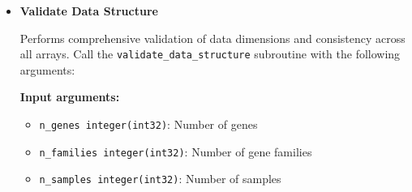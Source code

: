 \begin{enumerate}
\begin{itemize}
\begin{itemize}
                    \item \texttt{expression\_vectors real(real64), allocatable}: Expression
                          data matrix (reallocated)
                          
                    \item \texttt{gene\_to\_fam integer(int32), allocatable}: Gene to family
                          mapping (reallocated)
                          
                    \item \texttt{ierr integer(int32)}: Error code
                  \end{itemize}
                  \begin{lstlisting}[language=Fortran, caption={Filter Unassigned Genes}]
character(len=256), allocatable :: gene_ids(n_genes)
real(real64), allocatable :: expr_data(n_samples,n_genes)
integer(int32), allocatable :: gene_to_fam(n_genes)
logical :: unassigned_mask(n_genes)
integer(int32) :: n_kept, ierr

! First create the mask
call get_unassigned_mask(gene_to_fam, unassigned_mask, n_kept)

! Then apply it to filter all arrays
call apply_unassigned_mask(gene_ids, expr_data, gene_to_fam, &
                          unassigned_mask, n_kept, ierr)
! Arrays are now reallocated to size n_kept
                  \end{lstlisting}
                  
            \item \textbf{Validate Data Structure}
                  
                  Performs comprehensive validation of data dimensions and consistency across
                  all arrays. Call the \texttt{validate\_data\_structure} subroutine with
                  the following arguments:
                  
                  \textbf{Input arguments:}
                  \begin{itemize}
                    \item \texttt{n\_genes integer(int32)}: Number of genes
                          
                    \item \texttt{n\_families integer(int32)}: Number of gene families
                          
                    \item \texttt{n\_samples integer(int32)}: Number of samples
                          

\end{itemize}
\end{itemize}
\end{enumerate}
